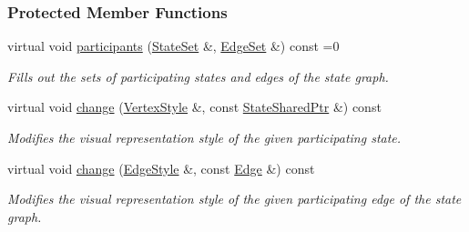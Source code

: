 \subsubsection*{Protected Member Functions}
\begin{DoxyCompactItemize}
\item 
virtual void \hyperlink{structevent_1_1UniformChange_a582bd18d2ec423a5baf7e6b9263ae762}{participants} (\hyperlink{structevent_1_1UniformChange_a71997f4cc920d6c5c65fab2049d5e42d}{State\+Set} \&, \hyperlink{structevent_1_1UniformChange_a01841b7c7ff05760a96c8b239f82a29c}{Edge\+Set} \&) const =0\hypertarget{structevent_1_1UniformChange_a582bd18d2ec423a5baf7e6b9263ae762}{}\label{structevent_1_1UniformChange_a582bd18d2ec423a5baf7e6b9263ae762}

\begin{DoxyCompactList}\small\item\em Fills out the sets of participating states and edges of the state graph. \end{DoxyCompactList}\item 
virtual void \hyperlink{structevent_1_1UniformChange_af044e7e42b19d8d80fb239f0fadfd7ae}{change} (\hyperlink{structVertexStyle}{Vertex\+Style} \&, const \hyperlink{structevent_1_1UniformChange_a8f41f1a24c711875b55419d9f0eb6bd2}{State\+Shared\+Ptr} \&) const \hypertarget{structevent_1_1UniformChange_af044e7e42b19d8d80fb239f0fadfd7ae}{}\label{structevent_1_1UniformChange_af044e7e42b19d8d80fb239f0fadfd7ae}

\begin{DoxyCompactList}\small\item\em Modifies the visual representation style of the given participating state. \end{DoxyCompactList}\item 
virtual void \hyperlink{structevent_1_1UniformChange_ab8c9f954ef9d681d33b65770f4352f70}{change} (\hyperlink{structEdgeStyle}{Edge\+Style} \&, const \hyperlink{structevent_1_1UniformChange_a74eab4759202393dcf9438a25bd9261e}{Edge} \&) const \hypertarget{structevent_1_1UniformChange_ab8c9f954ef9d681d33b65770f4352f70}{}\label{structevent_1_1UniformChange_ab8c9f954ef9d681d33b65770f4352f70}

\begin{DoxyCompactList}\small\item\em Modifies the visual representation style of the given participating edge of the state graph. \end{DoxyCompactList}\end{DoxyCompactItemize}


